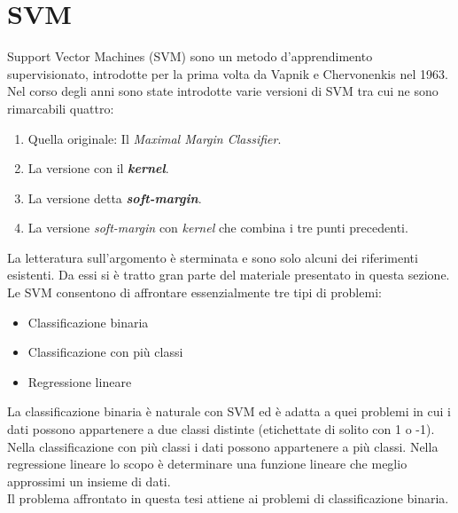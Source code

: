 \section{SVM}
Support Vector Machines (\ac{SVM}) sono un metodo d'apprendimento supervisionato, introdotte per la prima volta da Vapnik e Chervonenkis nel 1963. Nel corso degli anni sono state introdotte varie versioni di \ac{SVM} tra cui ne sono rimarcabili quattro:
\begin{enumerate}
\item Quella originale: Il \textit{Maximal Margin Classifier}.
\item La versione con il \textbf{\textit{kernel}}.
\item La versione detta \textbf{\textit{soft-margin}}.
\item La versione \textit{soft-margin} con \textit{kernel} che combina i tre punti precedenti.
\end{enumerate}
La letteratura sull'argomento è sterminata e \cite{Osuna97} \cite{Burges98} \cite{Ng}  sono solo alcuni dei riferimenti esistenti. Da essi si è tratto gran parte del materiale presentato in questa sezione.
 Le \ac{SVM} consentono di affrontare essenzialmente tre tipi di problemi:
\begin{itemize}
\item Classificazione binaria
\item Classificazione con più classi
\item Regressione lineare
\end{itemize}   

La classificazione binaria è naturale con \ac{SVM} ed è adatta a quei problemi in cui i dati possono appartenere a due classi distinte (etichettate di solito con 1 o -1).\\
Nella classificazione con più classi i dati possono appartenere a più classi.
Nella regressione lineare lo scopo è determinare una funzione lineare che meglio approssimi  un insieme di dati.\\
Il problema affrontato in questa tesi attiene ai problemi di classificazione binaria.

